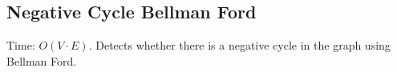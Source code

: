 \subsection{Negative Cycle Bellman Ford}

Time: $O(V \cdot E)$.
Detects whether there is a negative cycle in the graph using Bellman Ford.

